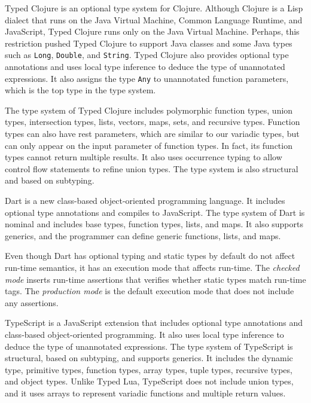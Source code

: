 Typed Clojure \citep{bonnaire-sergeant2012typed-clojure} is an
optional type system for Clojure.
Although Clojure is a Lisp dialect that runs on the Java Virtual Machine,
Common Language Runtime, and JavaScript, Typed Clojure runs only on
the Java Virtual Machine.
Perhaps, this restriction pushed Typed Clojure to support Java classes
and some Java types such as \texttt{Long}, \texttt{Double}, and \texttt{String}.
Typed Clojure also provides optional type annotations and uses
local type inference to deduce the type of unannotated expressions.
It also assigns the type \texttt{Any} to unannotated function parameters,
which is the top type in the type system.

The type system of Typed Clojure includes polymorphic function types,
union types, intersection types, lists, vectors, maps, sets, and recursive types.
Function types can also have rest parameters, which are similar
to our variadic types, but can only appear on the input parameter
of function types.
In fact, its function types cannot return multiple results.
It also uses occurrence typing to allow control flow statements to
refine union types.
The type system is also structural and based on subtyping.

Dart \citep{dart} is a new class-based object-oriented programming
language.
It includes optional type annotations and compiles to JavaScript.
The type system of Dart is nominal and includes base types,
function types, lists, and maps.
It also supports generics, and the programmer can define
generic functions, lists, and maps.

Even though Dart has optional typing and static types by
default do not affect run-time semantics, it has an
execution mode that affects run-time.
The \emph{checked mode} inserts run-time assertions that
verifies whether static types match run-time tags.
The \emph{production mode} is the default execution mode
that does not include any assertions.

TypeScript \citep{typescript} is a JavaScript extension
that includes optional type annotations and class-based
object-oriented programming.
It also uses local type inference to deduce the type
of unannotated expressions.
The type system of TypeScript is structural, based
on subtyping, and supports generics.
It includes the dynamic type, primitive types, function
types, array types, tuple types, recursive types, and
object types.
Unlike Typed Lua, TypeScript does not include union types,
and it uses arrays to represent variadic functions and
multiple return values.

